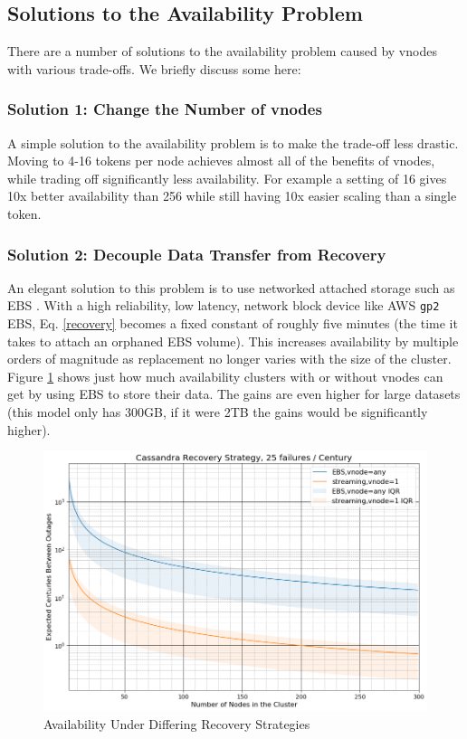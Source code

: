 \documentclass{article}
\begin{document}
\subsection{Solutions to the Availability Problem}
\label{sec:solutions}
There are a number of solutions to the availability problem caused by
vnodes with various trade-offs. We briefly discuss some here:

\subsubsection{Solution 1: Change the Number of vnodes}
A simple solution to the availability problem is to make the trade-off
less drastic. Moving to 4-16 tokens per node achieves almost all of the
benefits of vnodes, while trading off significantly less availability.
For example a setting of 16 gives 10x better availability than 256 while
still having 10x easier scaling than a single token.

\subsubsection{Solution 2: Decouple Data Transfer from Recovery}
An elegant solution to this problem is to use networked attached storage
such as EBS \cite{ebs}. With a high reliability, low latency, network
block device like AWS \texttt{gp2} EBS, Eq. \ref{recovery} becomes a
fixed constant of roughly five minutes (the time it takes to attach an
orphaned EBS volume). This increases availability by multiple orders of
magnitude as replacement no longer varies with the size of the cluster.
Figure \ref{fig:ebs} shows just how much availability clusters with or
without vnodes can get by using EBS to store their data. The gains are
even higher for large datasets (this model only has 300GB, if it were
2TB the gains would be significantly higher).

\begin{figure}[h!]
    \centering
    \includegraphics[width=1.0\textwidth]{images/recovery_strategy.png}
    \caption{Availability Under Differing Recovery Strategies}
    \label{fig:ebs}
\end{figure}
\end{document}
